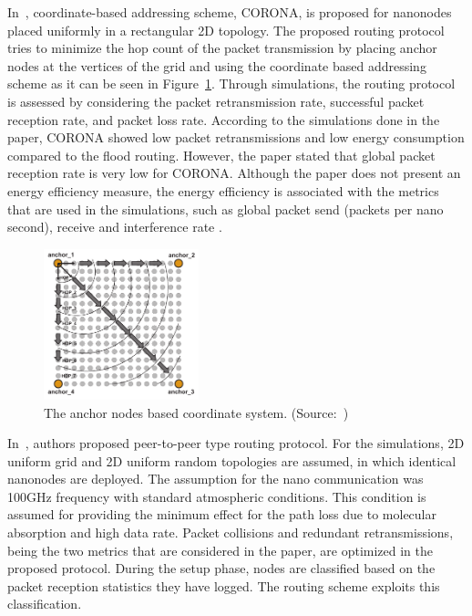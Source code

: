 \documentclass[12pt, oneandhalf, chaparabic, sees, ms]{metu}
\begin{document}
In~\cite{liaskos2015}, coordinate-based addressing scheme, CORONA, is proposed for nanonodes placed uniformly in a rectangular 2D topology.
The proposed routing protocol tries to minimize the hop count of the packet transmission by placing anchor nodes 
at the vertices of the grid and using the coordinate based addressing scheme as it can be seen in Figure~\ref{fig:anchor}.
Through simulations, the routing protocol is assessed by considering the packet retransmission
rate, successful packet reception rate, and packet loss rate. According to the simulations done in the paper, 
CORONA showed low packet retransmissions and low energy consumption compared to the flood routing. However, the paper stated that 
global packet reception rate is very low for CORONA.
Although the paper does not present an energy efficiency measure, the energy efficiency is associated with the metrics that are used 
in the simulations, such as global packet send (packets per nano second), receive and interference rate .
% 
%
%
\begin{figure}[!htbp]
 \begin{center}
  \includegraphics[width=0.4\textwidth]{anchor.png}
 \end{center}
 \caption{The anchor nodes based coordinate system. (Source:~\protect\cite{liaskos2015})}
  \label{fig:anchor}
\end{figure}
% 
%
%
\vspace{-0.5cm}

In~\cite{liaskos2016}, authors proposed peer-to-peer type routing protocol. For the simulations, 2D uniform grid and 2D uniform random
topologies are assumed, in which identical nanonodes are deployed. The assumption for the nano communication was 100GHz frequency with standard atmospheric conditions.
This condition is assumed for providing the minimum effect for the path loss due to molecular absorption and high data rate.
Packet collisions and redundant retransmissions, being the two metrics that are considered in the paper, 
are optimized in the proposed protocol. During the setup phase, nodes are classified based on the packet reception 
statistics they have logged. The routing scheme exploits this classification.
\end{document}
